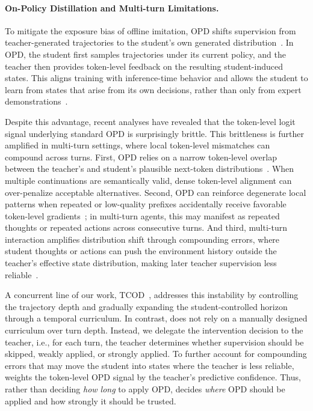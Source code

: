 \paragraph{On-Policy Distillation and Multi-turn Limitations.}
To mitigate the exposure bias of offline imitation, OPD shifts supervision from teacher-generated trajectories to the student's own generated distribution~\citep{agarwal2024policy, lu2025onpolicydistillation, zhou2026omniopd}. 
%
In OPD, the student first samples trajectories under its current policy, and the teacher then provides token-level feedback on the resulting student-induced states. 
%
This aligns training with inference-time behavior and allows the student to learn from states that arise from its own decisions, rather than only from expert demonstrations~\citep{zhao2026self, he2026self, hubotter2026reinforcement, hao2026self}.
%

Despite this advantage, recent analyses have revealed that the token-level logit signal underlying standard OPD is surprisingly brittle.
%
This brittleness is further amplified in multi-turn settings, where local token-level mismatches can compound across turns. 
%
First, OPD relies on a narrow token-level overlap between the teacher's and student's plausible next-token distributions~\citep{li2026rethinking}. 
%
When multiple continuations are semantically valid, dense token-level alignment can over-penalize acceptable alternatives. 
%
Second, OPD can reinforce degenerate local patterns when repeated or low-quality prefixes accidentally receive favorable token-level gradients~\citep{luo2026demystifying}; in multi-turn agents, this may manifest as repeated thoughts or repeated actions across consecutive turns. 
%
And third, multi-turn interaction amplifies distribution shift through compounding errors, where student thoughts or actions can push the environment history outside the teacher's effective state distribution, making later teacher supervision less reliable~\citep{wang2026tcod, li2025beyond}.
%

A concurrent line of our work, TCOD~\citep{wang2026tcod}, addresses this instability by controlling the trajectory depth and gradually expanding the student-controlled horizon through a temporal curriculum. 
%
In contrast, \ours does not rely on a manually designed curriculum over turn depth. 
%
Instead, we delegate the intervention decision to the teacher, i.e., for each turn, the teacher determines whether supervision should be skipped, weakly applied, or strongly applied. 
%
To further account for compounding errors that may move the student into states where the teacher is less reliable, \ours weights the token-level OPD signal by the teacher's predictive confidence. 
%
Thus, rather than deciding \emph{how long} to apply OPD, \ours decides \emph{where} OPD should be applied and how strongly it should be trusted.
%